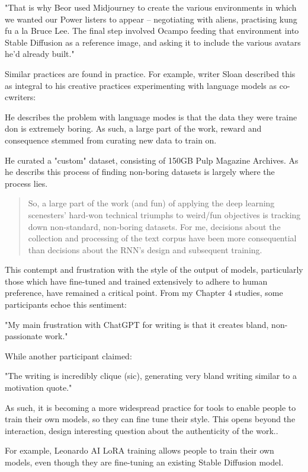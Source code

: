 "That is why Beor used Midjourney to create the various environments in which we wanted our Power listers to appear – negotiating with aliens, practising kung fu a la Bruce Lee. The final step involved Ocampo feeding that environment into Stable Diffusion as a reference image, and asking it to include the various avatars he’d already built."

Similar practices are found in practice. For example, writer Sloan described this as integral to his creative practices experimenting with language models as co-cwriters:

He describes the problem with language modes is that the data they were traine don is extremely boring. 
As such, a large part of the work, reward and consequence stemmed from curating new data to train on. 

He curated a "custom" dataset, consisting of 150GB Pulp Magazine Archives. As he describs this process of finding non-boring datasets is largely where the process lies. 
\begin{quote}
    So, a large part of the work (and fun) of applying the deep learning scenesters’ hard-won technical triumphs to weird/fun objectives is tracking down non-standard, non-boring datasets. For me, decisions about the collection and processing of the text corpus have been more consequential than decisions about the RNN’s design and subsequent training.
\end{quote}

This contempt and frustration with the style of the output of models, particularly those which have fine-tuned and trained extensively to adhere to human preference, have remained a critical point. From my Chapter 4 studies, some participants echoe this sentiment: 


"My main frustration with ChatGPT for writing is that it creates bland, non-passionate work."

While another participant claimed: 

"The writing is incredibly clique (sic), generating very bland writing similar to a motivation quote."


As such, it is becoming a more widespread practice for tools to enable people to train their own models, so they can fine tune their style. This opens beyond the interaction, design interesting question about the authenticity of the work.. 

For example, Leonardo AI LoRA training allows people to train their own models, even though they are fine-tuning an existing Stable Diffusion model. 


